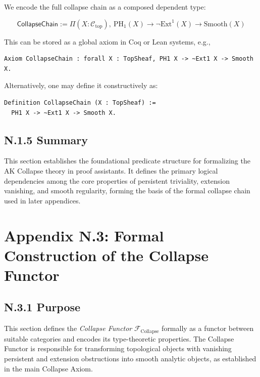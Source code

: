 \documentclass[11pt]{article}
\begin{document}
We encode the full collapse chain as a composed dependent type:

\[
\textsf{CollapseChain} :=
\Pi (X : \mathcal{C}_{\mathrm{top}}),\ 
\mathrm{PH}_1(X) \rightarrow \neg \mathrm{Ext}^1(X) \rightarrow \mathrm{Smooth}(X)
\]

This can be stored as a global axiom in Coq or Lean systems, e.g.,

\begin{verbatim}
Axiom CollapseChain : forall X : TopSheaf, PH1 X -> ~Ext1 X -> Smooth X.
\end{verbatim}

Alternatively, one may define it constructively as:

\begin{verbatim}
Definition CollapseChain (X : TopSheaf) :=
  PH1 X -> ~Ext1 X -> Smooth X.
\end{verbatim}

\subsection*{N.1.5 Summary}

This section establishes the foundational predicate structure for formalizing the AK Collapse theory in proof assistants.  
It defines the primary logical dependencies among the core properties of persistent triviality, extension vanishing,  
and smooth regularity, forming the basis of the formal collapse chain used in later appendices.




\section*{Appendix N.3: Formal Construction of the Collapse Functor}

\subsection*{N.3.1 Purpose}

This section defines the \textit{Collapse Functor} $\mathcal{F}_{\mathrm{Collapse}}$ formally as a functor between suitable categories  
and encodes its type-theoretic properties. The Collapse Functor is responsible for transforming topological objects with vanishing  
persistent and extension obstructions into smooth analytic objects, as established in the main Collapse Axiom.
\end{document}
